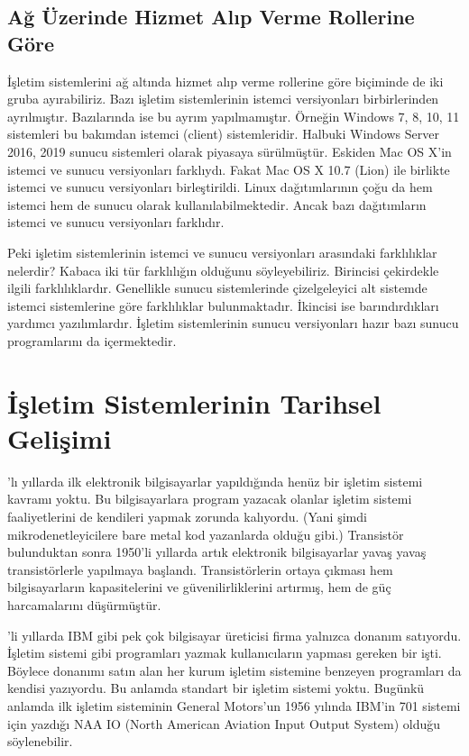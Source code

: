 \documentclass[a4paper,10pt,turkish]{sphinxmanual}
\begin{document}
\subsection{Ağ Üzerinde Hizmet Alıp Verme Rollerine Göre}
\label{\detokenize{introduction:ag-uzerinde-hizmet-alip-verme-rollerine-gore}}
\sphinxAtStartPar
İşletim sistemlerini ağ altında hizmet alıp verme rollerine göre  biçiminde de iki gruba ayırabiliriz. Bazı işletim sistemlerinin istemci
versiyonları birbirlerinden ayrılmıştır. Bazılarında ise bu ayrım yapılmamıştır. Örneğin
Windows 7, 8, 10, 11 sistemleri bu bakımdan istemci (client) sistemleridir. Halbuki Windows
Server 2016, 2019 sunucu sistemleri olarak piyasaya sürülmüştür. Eskiden Mac OS X’in
istemci ve sunucu versiyonları farklıydı. Fakat Mac OS X 10.7 (Lion) ile birlikte istemci
ve sunucu versiyonları birleştirildi. Linux dağıtımlarının çoğu da hem istemci hem de
sunucu olarak kullanılabilmektedir. Ancak bazı dağıtımların istemci ve sunucu versiyonları
farklıdır.

\sphinxAtStartPar
Peki işletim sistemlerinin istemci ve sunucu versiyonları arasındaki farklılıklar nelerdir?
Kabaca iki tür farklılığın olduğunu söyleyebiliriz. Birincisi çekirdekle ilgili
farklılıklardır. Genellikle sunucu sistemlerinde çizelgeleyici alt sistemde istemci
sistemlerine göre farklılıklar bulunmaktadır. İkincisi ise barındırdıkları yardımcı
yazılımlardır. İşletim sistemlerinin sunucu versiyonları hazır bazı sunucu programlarını
da içermektedir.


\section{İşletim Sistemlerinin Tarihsel Gelişimi}
\label{\detokenize{introduction:isletim-sistemlerinin-tarihsel-gelisimi}}
’lı yıllarda ilk elektronik bilgisayarlar yapıldığında henüz bir işletim sistemi
kavramı yoktu. Bu bilgisayarlara program yazacak olanlar işletim sistemi faaliyetlerini de
kendileri yapmak zorunda kalıyordu. (Yani şimdi mikrodenetleyicilere bare metal kod
yazanlarda olduğu gibi.) Transistör bulunduktan sonra 1950’li yıllarda artık elektronik
bilgisayarlar yavaş yavaş transistörlerle yapılmaya başlandı. Transistörlerin ortaya
çıkması hem bilgisayarların kapasitelerini ve güvenilirliklerini artırmış, hem de güç
harcamalarını düşürmüştür.

’li yıllarda IBM gibi pek çok bilgisayar üreticisi firma yalnızca donanım satıyordu.
İşletim sistemi gibi programları yazmak kullanıcıların yapması gereken bir işti. Böylece
donanımı satın alan her kurum işletim sistemine benzeyen programları da kendisi yazıyordu.
Bu anlamda standart bir işletim sistemi yoktu. Bugünkü anlamda ilk işletim sisteminin
General Motors’un 1956 yılında IBM’in 701 sistemi için yazdığı NAA IO (North American
Aviation Input Output System) olduğu söylenebilir.
\end{document}
